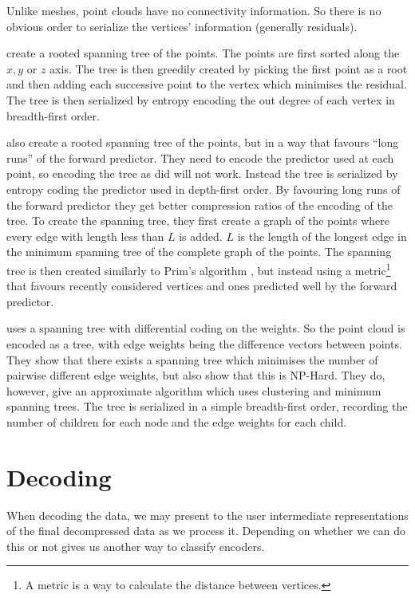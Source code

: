 \documentclass{report}
\begin{document}
Unlike meshes, point clouds have no connectivity information. So there is no
obvious order to serialize the vertices' information (generally residuals).

\citet{gumholdcomp} create a rooted spanning tree of the points. The points
are first sorted along the $x, y$ or $z$ axis. The tree is then greedily
created by picking the first point as a root and then adding each successive
point to the vertex which minimises the residual. The tree is then serialized
by entropy encoding the out degree of each vertex in breadth-first order.

\citet{merrycomp} also create a rooted spanning tree of the points, but in a
way that favours ``long runs'' of the forward predictor. They need to encode
the predictor used at each point, so encoding the tree as \citet{gumholdcomp}
did will not work. Instead the tree is serialized by entropy coding the
predictor used in depth-first order. By favouring long runs of the forward
predictor they get better compression ratios of the encoding of the tree. To
create the spanning tree, they first create a graph of the points where every
edge with length less than $L$ is added. $L$ is the length of the longest edge
in the minimum spanning tree of the complete graph of the points. The spanning
tree is then created similarly to Prim's algorithm \citep[p.\ 457]{sedgewick},
but instead using a metric\footnote{A metric is a way to calculate the
  distance between vertices.} that favours recently considered vertices and
ones predicted well by the forward predictor.

\citet{chen2005lcp} uses a spanning tree with differential coding on the
weights. So the point cloud is encoded as a tree, with edge weights being the
difference vectors between points. They show that there exists a spanning tree
which minimises the number of pairwise different edge weights, but also show
that this is NP-Hard. They do, however, give an approximate algorithm which
uses clustering and minimum spanning trees. The tree is serialized in a simple
breadth-first order, recording the number of children for each node and the
edge weights for each child.


\section{Decoding}

When decoding the data, we may present to the user intermediate
representations of the final decompressed data as we process it. Depending on
whether we can do this or not gives us another way to classify encoders.
\end{document}
